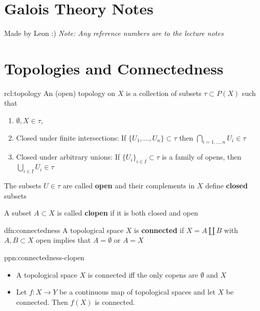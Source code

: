 \documentclass[landscape, 8pt]{extarticle}
\begin{document}
\setlength{\abovedisplayskip}{3.5pt}
\setlength{\belowdisplayskip}{3.5pt}
\setlength{\abovedisplayshortskip}{3.5pt}
\setlength{\belowdisplayshortskip}{3.5pt}

\begin{multicols}{3}
\raggedcolumns


\section*{\huge Galois Theory Notes}
Made by Leon :) \textit{Note: Any reference numbers are to the lecture notes}

\section{Topologies and Connectedness}\setcounter{subsection}{1}
\begin{rcl}[Topology]{rcl:topology}{}
    An (open) topology on $X$ is a collection of subsets $\tau \subset P(X)$ such that
    \begin{enumerate}[leftmargin=*]
        \item $\emptyset, X \in \tau$,
        \item Closed under finite intersections: If $\{U_{1},\dots,U_{n}\} \subset \tau$ then $\bigcap_{i=1,\dots,n} U_{i} \in \tau$
        \item Closed under arbitrary unions: If $\{U_{i}\}_{i\in I} \subset \tau$ is a family of opens, then $\bigcup_{i\in I} U_{i}\in \tau$
    \end{enumerate}
    The subsets $U\in \tau$ are called \textbf{open} and their complements in $X$ define \textbf{closed} subsets

    A subset $A \subset X $ is called \textbf{clopen} if it is both closed and open
\end{rcl}

\begin{dfn}{dfn:connectedness}{}
    A topological space $X$ is \textbf{connected} if $X = A \amalg B$ with $A, B \subset X$ open implies that $A = \emptyset$ or $A = X$
\end{dfn}

\begin{ppn}{ppn:connectedness-clopen}{}
    \begin{itemize}
        \item A topological space $X$ is connected iff the only copens are $\emptyset$ and $X$
        \item Let $f : X \to Y$ be a continuous map of topological spaces and let $X$ be connected. Then $f(X)$ is connected.
    \end{itemize}
\end{ppn}


\lipsum[1-12]
\end{multicols}
\end{document}
